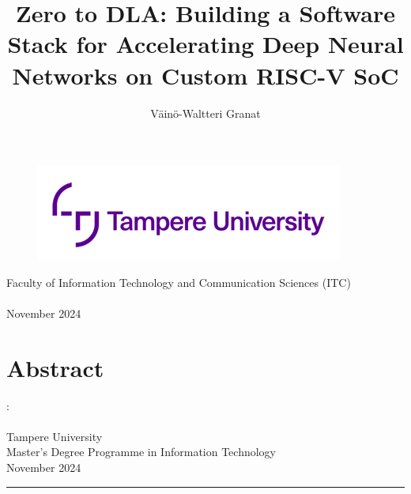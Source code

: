 \documentclass[12pt,a4paper,english
]{tunithesis}
\author{Väinö-Waltteri Granat}
\title{Zero to DLA: Building a Software Stack for Accelerating Deep Neural Networks on Custom RISC-V SoC} %
\begin{document}
\makeatletter

\thispagestyle{empty}
\vspace*{-.5cm}\noindent

\begin{figure}
    \vspace{-1.3cm}
    \advance\leftskip-2.5cm
    \noindent\includegraphics{img/tunilogo.png}
\end{figure}
 
\vspace{2.5cm}
\begin{flushright}
\noindent\textsf{\LARGE{\@author}}

\noindent\vspace{0.5cm}

\noindent\Huge{\textsf{\textbf{\textcolor{tunipurple}{\@title}}}}
\end{flushright}
\vspace{10.7cm} %

\begin{flushright}  
    \begin{spacing}{1.0}
      \textsf{Faculty of Information Technology and Communication Sciences (ITC)\\
      \@thesistype\\
      November 2024}
    \end{spacing}
\end{flushright}

\if@twoside
\clearpage
\fi



\chapter*{Abstract}

\begin{spacing}{1.0}
\noindent \@author: \@title\\
\@thesistype\\
Tampere University\\
Master’s Degree Programme in Information Technology\\
November 2024
\end{spacing}
\noindent\rule{12cm}{0.4pt}
\end{document}
